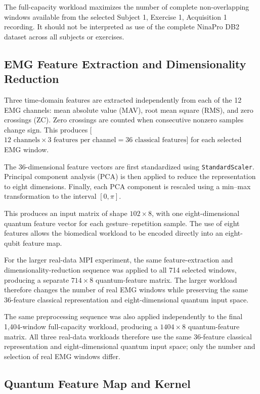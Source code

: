 \documentclass[pdflatex,sn-mathphys-num]{sn-jnl}%
\theoremstyle{thmstyleone}%
\theoremstyle{thmstyletwo}%
\theoremstyle{thmstylethree}%
\begin{document}
The full-capacity workload maximizes the number of complete non-overlapping
windows available from the selected Subject 1, Exercise 1, Acquisition 1
recording. It should not be interpreted as use of the complete NinaPro DB2
dataset across all subjects or exercises.


\subsection{EMG Feature Extraction and Dimensionality Reduction}
\label{subsec:emg-processing}

Three time-domain features are extracted independently from each of the 12 EMG
channels: mean absolute value (MAV), root mean square (RMS), and zero crossings
(ZC). Zero crossings are counted when consecutive nonzero samples change sign.
This produces [\(12 \text{ channels} \times 3 \text{ features per channel} = 36 \text{ classical features}\)] for each selected EMG window.

The 36-dimensional feature vectors are first standardized using
\texttt{StandardScaler}. Principal component analysis (PCA) is then applied to
reduce the representation to eight dimensions. Finally, each PCA component is
rescaled using a min--max transformation to the interval \([0,\pi].\)

This produces an input matrix of shape $102\times8$, with one eight-dimensional
quantum feature vector for each gesture--repetition sample. The use of eight
features allows the biomedical workload to be encoded directly into an
eight-qubit feature map.

For the larger real-data MPI experiment, the same feature-extraction and
dimensionality-reduction sequence was applied to all 714 selected windows,
producing a separate $714\times8$ quantum-feature matrix. The larger workload
therefore changes the number of real EMG windows while preserving the same
36-feature classical representation and eight-dimensional quantum input space.

The same preprocessing sequence was also applied independently to the final
1,404-window full-capacity workload, producing a $1404\times8$ quantum-feature
matrix. All three real-data workloads therefore use the same 36-feature
classical representation and eight-dimensional quantum input space; only the
number and selection of real EMG windows differ.

\subsection{Quantum Feature Map and Kernel}\label{subsec:quantum-kernel}
\end{document}
